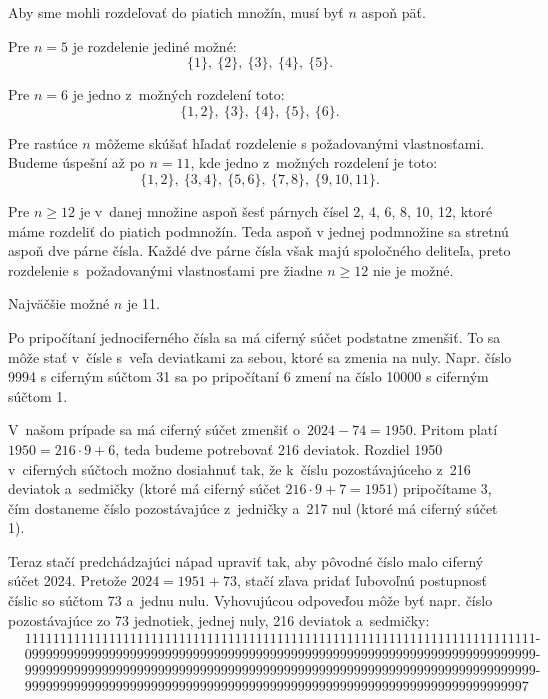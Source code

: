 {%
Aby sme mohli rozdeľovať do piatich množín, musí byť $n$ aspoň päť.

Pre $n=5$ je rozdelenie jediné možné:
$$
\{1\},\ \{2\},\ \{3\},\ \{4\},\ \{5\}.
$$

Pre $n=6$ je jedno z~možných rozdelení toto:
$$
\{1,2\},\ \{3\},\ \{4\},\ \{5\},\ \{6\}.
$$

Pre rastúce $n$ môžeme skúšať hľadať rozdelenie s požadovanými vlastnosťami.
Budeme úspešní až po $n=11$, kde jedno z~možných rozdelení je toto:
$$
\{1,2\},\ \{3,4\},\ \{5,6\},\ \{7,8\},\ \{9,10,11\}.
$$

Pre $n\ge 12$ je v~danej množine aspoň šesť párnych čísel 2, 4, 6, 8, 10, 12, ktoré máme rozdeliť do piatich podmnožín.
Teda aspoň v jednej podmnožine sa stretnú aspoň dve párne čísla.
Každé dve párne čísla však majú spoločného deliteľa, preto rozdelenie s~požadovanými vlastnosťami pre žiadne $n\ge 12$ nie je možné.

Najväčšie možné $n$ je 11.
}

{%
Po pripočítaní jednociferného čísla sa má ciferný súčet podstatne zmenšiť.
To sa môže stať v~čísle s~veľa deviatkami za sebou, ktoré sa zmenia na nuly.
Napr. číslo 9994 s ciferným súčtom 31 sa po pripočítaní 6 zmení na číslo 10000 s ciferným súčtom 1.

V~našom prípade sa má ciferný súčet zmenšiť o~$2024-74 =1950$.
Pritom platí $1950=216\cdot9 +6$, teda budeme potrebovať 216 deviatok.
Rozdiel 1950 v~ciferných súčtoch možno dosiahnuť tak, že k~číslu pozostávajúceho z~216 deviatok a~sedmičky (ktoré má ciferný súčet $216\cdot9+7 =1951$) pripočítame 3, čím dostaneme číslo pozostávajúce z~jedničky a~217 nul (ktoré má ciferný súčet 1).

Teraz stačí predchádzajúci nápad upraviť tak, aby pôvodné číslo malo ciferný súčet 2024.
Pretože $2024 =1951+73$, stačí zľava pridať ľubovoľnú postupnosť číslic so súčtom 73 a~jednu nulu.
Vyhovujúcou odpoveďou môže byť napr. číslo pozostávajúce zo 73 jednotiek, jednej nuly, 216 deviatok a~sedmičky:
$$
\begin{aligned}
&1111111111111111111111111111111111111111111111111111111111111111111111111\text{-}\\
&0999999999999999999999999999999999999999999999999999999999999999999999999\text{-}\\
&9999999999999999999999999999999999999999999999999999999999999999999999999\text{-}\\
&999999999999999999999999999999999999999999999999999999999999999999999997
\end{aligned}
$$
}


